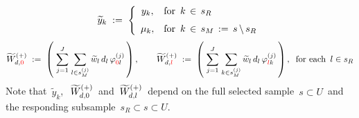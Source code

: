 \begin{equation*}
\widetilde{y}_{k}
\; := \;
    \left\{\begin{array}{cl}
        y_{k}, & \textnormal{for \,$k \,\in\, s_{R}$}
        \\
        \overset{{\color{white}\textnormal{\large1}}}{\mu_{k}}, & \textnormal{for \,$k \,\in\, s_{M} \,:=\, s \,\backslash\, s_{R}$}
        \end{array}\right.
\end{equation*}
\begin{equation*}
\widetilde{W}^{(+)}_{d,{\color{red}0}}
\; := \;
    \left(\;
        \overset{J}{\underset{j=1}{\sum}}\;
        \underset{l \in s_{M}^{(j)}}{\sum}\,
        \widetilde{w}_{l}\,d_{l}\,\varphi^{(j)}_{{\color{red}0}l}
        \,\right),
\quad\quad
\widetilde{W}^{(+)}_{d,{\color{red}l}}
\; := \;
    \left(\;
        \overset{J}{\underset{j=1}{\sum}}\;
        \underset{k \in s_{M}^{(j)}}{\sum}\,
        \widetilde{w}_{l}\,d_{l}\,\varphi^{(j)}_{{\color{red}l}k}
        \,\right),
\;\;
\textnormal{for each \,$l \in s_{R}$}
\end{equation*}
\vskip 0.3cm
\noindent
Note that
\,$\widetilde{y}_{k}$,\,
\,$\widetilde{W}^{(+)}_{d,{\color{black}0}}$\,
and
\,$\widetilde{W}^{(+)}_{d,{\color{black}l}}$\,
depend on the full selected sample
\,$s \subset U$\,
and the responding subsample
\,$s_{R} \subset s \subset U$.\,



